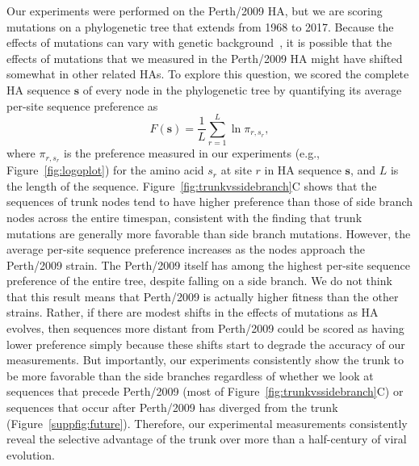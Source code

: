 \documentclass[9pt,twocolumn,twoside]{pnas-new}
\begin{document}
Our experiments were performed on the Perth/2009 HA, but we are scoring mutations on a phylogenetic tree that extends from 1968 to 2017.
Because the effects of mutations can vary with genetic background~\cite{gong2013stability,natarajan2013epistasis,harms2014historical,starr2016epistasis,starr2017alternative}, it is possible that the effects of mutations that we measured in the Perth/2009 HA might have shifted somewhat in other related HAs.
To explore this question, we scored the complete HA sequence $\mathbf{s}$ of every node in the phylogenetic tree by quantifying its average per-site sequence preference as 
\begin{equation}
F\left(\mathbf{s}\right) = \frac{1}{L}\displaystyle\sum_{r=1}^L \ln \pi_{r, s_r},
\end{equation}
where $\pi_{r, s_r}$ is the preference measured in our experiments (e.g., Figure~\ref{fig:logoplot}) for the amino acid $s_r$ at site $r$ in HA sequence $\mathbf{s}$, and $L$ is the length of the sequence.
Figure~\ref{fig:trunkvssidebranch}C shows that the sequences of trunk nodes tend to have higher preference than those of side branch nodes across the entire timespan, consistent with the finding that trunk mutations are generally more favorable than side branch mutations. 
However, the average per-site sequence preference increases as the nodes approach the Perth/2009 strain.
The Perth/2009 itself has among the highest per-site sequence preference of the entire tree, despite falling on a side branch.
We do not think that this result means that Perth/2009 is actually higher fitness than the other strains.
Rather, if there are modest shifts in the effects of mutations as HA evolves, then sequences more distant from Perth/2009 could be scored as having lower preference simply because these shifts start to degrade the accuracy of our measurements.
But importantly, our experiments consistently show the trunk to be more favorable than the side branches regardless of whether we look at sequences that precede Perth/2009 (most of Figure~\ref{fig:trunkvssidebranch}C) or sequences that occur after Perth/2009 has diverged from the trunk (Figure~\ref{suppfig:future}). 
Therefore, our experimental measurements consistently reveal the selective advantage of the trunk over more than a half-century of viral evolution.
\end{document}
